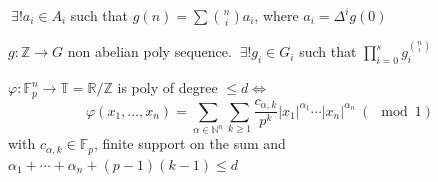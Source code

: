 \begin{proposition}
$\ \exists ! a_i \in A_i$ such that $g(n) = \sum \binom{n}{i}a_i$, where $a _i = \Delta ^ig(0)$
\end{proposition}

\begin{theorem}
$g : \mathbb{Z} \to G$ non abelian poly sequence. $\ \exists !g_i \in G_i$ such that $\prod _{i=0}^{s}g_i^{\binom{n}{i}}$
\end{theorem}


\begin{theorem}
$\varphi : \mathbb{F}_p^{n} \to \mathbb{T} = \mathbb{R}/\mathbb{Z}$ is poly of degree $ \leq d \Leftrightarrow $
\[
\varphi (x_1, \ldots, x_n) = \sum_{\alpha \in \mathbb{N}^{n}} \sum_{k \geq 1} \frac{c_{\alpha ,k}}{p^k} \lvert x_1 \rvert ^{\alpha _1 } \cdots \lvert x_n \rvert ^{\alpha _n} \ (\mod 1)
\]
with $c_{\alpha ,k} \in \mathbb{F}_p$, finite support on the sum and $\alpha _1 + \cdots + \alpha _n + (p-1)(k-1) \leq d$
\end{theorem}